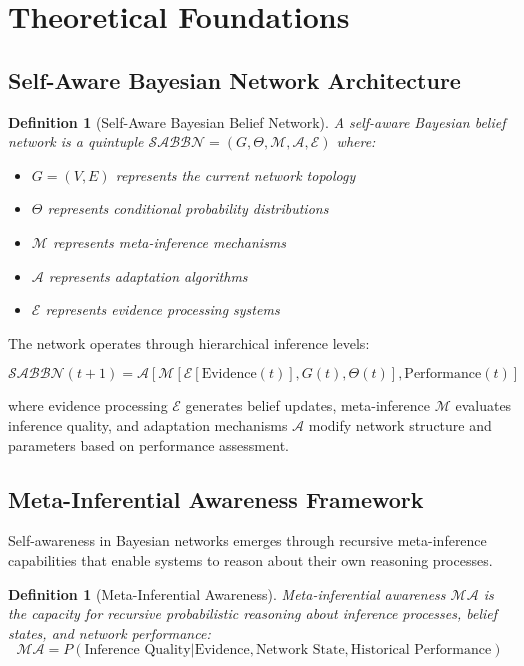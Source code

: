 \documentclass[12pt,a4paper]{article}
\newtheorem{definition}[theorem]{Definition}
\begin{document}
\section{Theoretical Foundations}

\subsection{Self-Aware Bayesian Network Architecture}

\begin{definition}[Self-Aware Bayesian Belief Network]
A self-aware Bayesian belief network is a quintuple $\mathcal{SABBN} = (G, \Theta, \mathcal{M}, \mathcal{A}, \mathcal{E})$ where:
\begin{itemize}
\item $G = (V, E)$ represents the current network topology
\item $\Theta$ represents conditional probability distributions
\item $\mathcal{M}$ represents meta-inference mechanisms
\item $\mathcal{A}$ represents adaptation algorithms
\item $\mathcal{E}$ represents evidence processing systems
\end{itemize}
\end{definition}

The network operates through hierarchical inference levels:

\begin{equation}
\mathcal{SABBN}(t+1) = \mathcal{A}[\mathcal{M}[\mathcal{E}[\text{Evidence}(t)], G(t), \Theta(t)], \text{Performance}(t)]
\end{equation}

where evidence processing $\mathcal{E}$ generates belief updates, meta-inference $\mathcal{M}$ evaluates inference quality, and adaptation mechanisms $\mathcal{A}$ modify network structure and parameters based on performance assessment.

\subsection{Meta-Inferential Awareness Framework}

Self-awareness in Bayesian networks emerges through recursive meta-inference capabilities that enable systems to reason about their own reasoning processes.

\begin{definition}[Meta-Inferential Awareness]
Meta-inferential awareness $\mathcal{MA}$ is the capacity for recursive probabilistic reasoning about inference processes, belief states, and network performance:
\begin{equation}
\mathcal{MA} = P(\text{Inference Quality} | \text{Evidence}, \text{Network State}, \text{Historical Performance})
\end{equation}
\end{definition}
\end{document}
